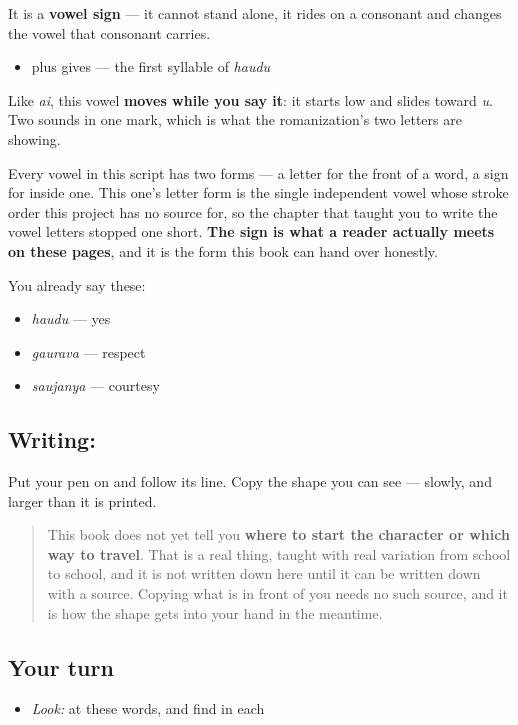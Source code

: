 It is a \textbf{vowel sign} — it cannot stand alone, it rides on a consonant and changes the vowel that consonant carries.

\begin{itemize}
\raggedright
  \item \textbf{} plus \textbf{} gives \textbf{} — the first syllable of \emph{haudu}
\end{itemize}

Like \emph{ai}, this vowel \textbf{moves while you say it}: it starts low and slides toward \emph{u}. Two sounds in one mark, which is what the romanization's two letters are showing.

Every vowel in this script has two forms — a letter for the front of a word, a sign for inside one. This one's letter form is the single independent vowel whose stroke order this project has no source for, so the chapter that taught you to write the vowel letters stopped one short. \textbf{The sign is what a reader actually meets on these pages}, and it is the form this book can hand over honestly.

You already say these:

\begin{itemize}
\raggedright
  \item \textbf{} \emph{haudu} — yes
  \item \textbf{} \emph{gaurava} — respect
  \item \textbf{} \emph{saujanya} — courtesy
\end{itemize}

\subsection*{Writing: }
Put your pen on  and follow its line. Copy the shape you can see — slowly, and larger than it is printed.

\begin{quote}
This book does not yet tell you \textbf{where to start the character or which way to travel}. That is a real thing, taught with real variation from school to school, and it is not written down here until it can be written down with a source. Copying what is in front of you needs no such source, and it is how the shape gets into your hand in the meantime.
\end{quote}

\subsection*{Your turn}
\begin{itemize}
\raggedright
  \item \emph{Look:} at these words, and find  in each
\end{itemize}

